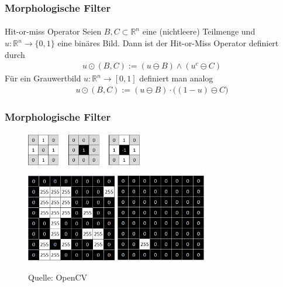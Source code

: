 \documentclass{beamer}
\begin{document}
\begin{frame}
    \frametitle{Morphologische Filter}
\framesubtitle{}

\begin{block}{Hit-or-miss Operator}
Seien $B,C \subset \mathbb{R}^n$ eine (nichtleere) Teilmenge und $u : \mathbb{R}^n \to \{ 0,1 \}$  eine binäres Bild. Dann ist der  Hit-or-Miss Operator definiert durch   
\begin{align*}
u   \odot (B,C) := (u \ominus B) \wedge (u^c \ominus C)
\end{align*}
Für ein Grauwertbild $u : \mathbb{R}^n \to [0,1]$ definiert man analog
\begin{align*}
u   \odot (B,C) := (u \ominus B) \cdot \bigl((1-u) \ominus C\bigr)
\end{align*}
\end{block}

 \end{frame}


\begin{frame}
    \frametitle{Morphologische Filter}
\framesubtitle{}

\begin{figure}[htp]
      \centering
    \includegraphics[width=0.45\textwidth]{img/hom1}  \\
    \includegraphics[width=0.35\textwidth]{img/hom2}   \; \; \includegraphics[width=0.35\textwidth]{img/hom3} 
      \caption{Quelle: OpenCV}
\end{figure}

 \end{frame}
\end{document}
